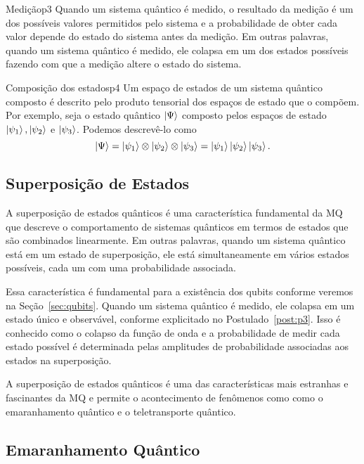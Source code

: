 \begin{post}{Medição}{p3}
Quando um sistema quântico é medido, o resultado da medição é um dos possíveis valores permitidos pelo sistema e a probabilidade de obter cada valor depende do estado do sistema antes da medição. Em outras palavras, quando um sistema quântico é medido, ele colapsa em um dos estados possíveis fazendo com que a medição altere o estado do sistema. 
\end{post}

\begin{post}{Composição dos estados}{p4}
Um espaço de estados de um sistema quântico composto é descrito pelo produto tensorial dos espaços de estado que o compõem. Por exemplo, seja o estado quântico $\ket{\Psi}$ composto pelos espaços de estado $\ket{\psi_1}, \ket{\psi_2}$ e $\ket{\psi_3}$. Podemos descrevê-lo como
\begin{equation}
  \ket{\Psi}=\ket{\psi_1} \otimes \ket{\psi_2} \otimes \ket{\psi_3} = \ket{\psi_1}\ket{\psi_2}\ket{\psi_3}.
\end{equation}
\end{post}

\subsection{Superposição de Estados}\label{sec:superposição}

A superposição de estados quânticos é uma característica fundamental da MQ que descreve o comportamento de sistemas quânticos em termos de estados que são combinados linearmente. Em outras palavras, quando um sistema quântico está em um estado de superposição, ele está simultaneamente em vários estados possíveis, cada um com uma probabilidade associada.

Essa característica é fundamental para a existência dos qubits conforme veremos na Seção~\ref{sec:qubits}. Quando um sistema quântico é medido, ele colapsa em um estado único e observável, conforme explicitado no Postulado~\ref{post:p3}. Isso é conhecido como o colapso da função de onda e a probabilidade de medir cada estado possível é determinada pelas amplitudes de probabilidade associadas aos estados na superposição.

A superposição de estados quânticos é uma das características mais estranhas e fascinantes da MQ e permite o acontecimento de fenômenos como como o emaranhamento quântico e o teletransporte quântico.


\subsection{Emaranhamento Quântico}\label{sec:emaranhamento}


